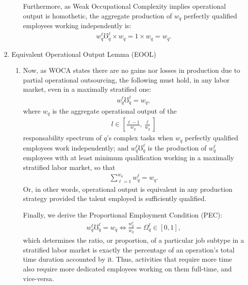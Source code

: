 \documentclass[hidelinks, nonatbib]{elsarticle}
\begin{document}
\begin{enumerate}
\begin{enumerate}
        Furthermore, as Weak Occupational Complexity implies operational output is homothetic, the aggregate production of $w_q$ perfectly qualified employees working independently is:
        \begin{gather}
            w_{q}^{\ell}
            \mho_{q}^{\ell}
            \times
            w_q
            =
            1
            \times
            w_q
            =
            w_q
            .
        \end{gather}
    \end{enumerate}
    \item Equivalent Operational Output Lemma (EOOL)
    \begin{enumerate}
        \item Now, as WOCA states there are no gains nor losses in production due to partial operational outsourcing, the following must hold, in any labor market, even in a maximally stratified one:
        \begin{gather}
            w_{q}^{\ell}
            \mho_{q}^{\ell}
            =
            w_q
            ,
        \end{gather}
        where $w_q$ is the aggregate operational output of the
        \begin{gather}
            l \in \left[
            \frac{\ell - 1}{w_q}
            ,
            \frac{\ell}{w_q}
        \right]
        \end{gather}
        responsability spectrum of $q$'s complex tasks when $w_q$ perfectly qualified employees work independently; and $w_{q}^{\ell}\mho_{q}^{\ell}$ is the production of $w_{q}^{\ell}$ employees with at least minimum qualification working in a maximally stratified labor market, so that
        \begin{gather}
            \sum_{\ell=1}^{w_q}
            w_{q}^{\ell}
            =
            w_q
            .
        \end{gather}
        Or, in other words, operational output is equivalent in any production strategy provided the talent employed is sufficiently qualified.

        Finally, we derive the Proportional Employment Condition (PEC):
        \begin{gather}
            w_{q}^{\ell}
            \mho_{q}^{\ell}
            =
            w_q
            \iff
            \frac{
                w_{q}^{\ell}
            }{
                w_q
            }
            =
            \Omega_{q}^{\ell}
            \in [0,1]
            ,
        \end{gather}
        which determines the ratio, or proportion, of a particular job subtype in a stratified labor market is exactly the percentage of an operation's total time duration accounted by it. Thus, activities that require more time also require more dedicated employees working on them full-time, and vice-versa.
    \end{enumerate}
\end{enumerate}

\end{document}
